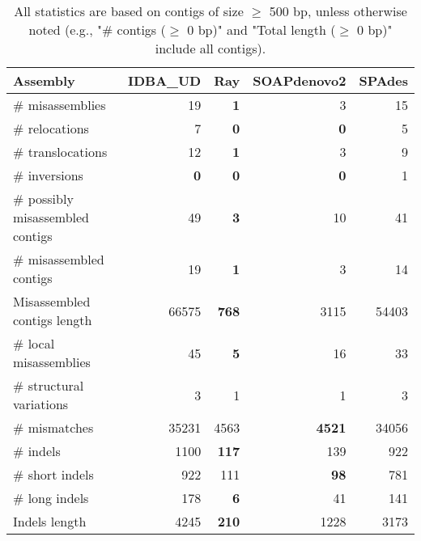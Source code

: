 \documentclass[12pt,a4paper]{article}
\begin{document}
\begin{table}[ht]
\begin{center}
\caption{All statistics are based on contigs of size $\geq$ 500 bp, unless otherwise noted (e.g., "\# contigs ($\geq$ 0 bp)" and "Total length ($\geq$ 0 bp)" include all contigs).}
\begin{tabular}{|l*{4}{|r}|}
\hline
Assembly & IDBA\_UD & Ray & SOAPdenovo2 & SPAdes \\ \hline
\# misassemblies & 19 & {\bf 1} & 3 & 15 \\ \hline
\hspace{5mm}\# relocations & 7 & {\bf 0} & {\bf 0} & 5 \\ \hline
\hspace{5mm}\# translocations & 12 & {\bf 1} & 3 & 9 \\ \hline
\hspace{5mm}\# inversions & {\bf 0} & {\bf 0} & {\bf 0} & 1 \\ \hline
\# possibly misassembled contigs & 49 & {\bf 3} & 10 & 41 \\ \hline
\# misassembled contigs & 19 & {\bf 1} & 3 & 14 \\ \hline
Misassembled contigs length & 66575 & {\bf 768} & 3115 & 54403 \\ \hline
\# local misassemblies & 45 & {\bf 5} & 16 & 33 \\ \hline
\# structural variations & 3 & 1 & 1 & 3 \\ \hline
\# mismatches & 35231 & 4563 & {\bf 4521} & 34056 \\ \hline
\# indels & 1100 & {\bf 117} & 139 & 922 \\ \hline
\hspace{5mm}\# short indels & 922 & 111 & {\bf 98} & 781 \\ \hline
\hspace{5mm}\# long indels & 178 & {\bf 6} & 41 & 141 \\ \hline
Indels length & 4245 & {\bf 210} & 1228 & 3173 \\ \hline
\end{tabular}
\end{center}
\end{table}
\end{document}
